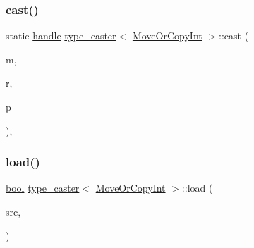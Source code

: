 \subsubsection{\texorpdfstring{cast()}{cast()}}
{\footnotesize\ttfamily static \mbox{\hyperlink{classhandle}{handle}} \mbox{\hyperlink{classtype__caster}{type\+\_\+caster}}$<$ \mbox{\hyperlink{class_move_or_copy_int}{Move\+Or\+Copy\+Int}} $>$\+::cast (\begin{DoxyParamCaption}\item[{const \mbox{\hyperlink{class_move_or_copy_int}{Move\+Or\+Copy\+Int}} \&}]{m,  }\item[{\mbox{\hyperlink{detail_2common_8h_adde72ab1fb0dd4b48a5232c349a53841}{return\+\_\+value\+\_\+policy}}}]{r,  }\item[{\mbox{\hyperlink{classhandle}{handle}}}]{p }\end{DoxyParamCaption})\hspace{0.3cm}{\ttfamily [inline]}, {\ttfamily [static]}}

\mbox{\label{structtype__caster_3_01_move_or_copy_int_01_4_a69ad2ad06da0da0f83ce3c37093d775b}} 
\subsubsection{\texorpdfstring{load()}{load()}}
{\footnotesize\ttfamily \mbox{\hyperlink{asdl_8h_af6a258d8f3ee5206d682d799316314b1}{bool}} \mbox{\hyperlink{classtype__caster}{type\+\_\+caster}}$<$ \mbox{\hyperlink{class_move_or_copy_int}{Move\+Or\+Copy\+Int}} $>$\+::load (\begin{DoxyParamCaption}\item[{\mbox{\hyperlink{classhandle}{handle}}}]{src,  }\item[{\mbox{\hyperlink{asdl_8h_af6a258d8f3ee5206d682d799316314b1}{bool}}}]{ }\end{DoxyParamCaption})\hspace{0.3cm}{\ttfamily [inline]}}

\mbox{\label{structtype__caster_3_01_move_or_copy_int_01_4_a88573a9d583d71125904b8766eecba81}} 
